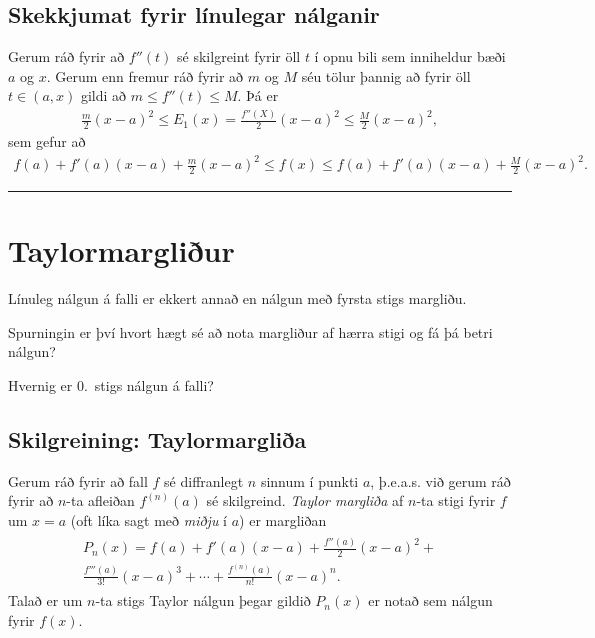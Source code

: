 \documentclass[a4paper,10pt,icelandic]{sphinxmanual}
\begin{document}
\subsection{Skekkjumat fyrir línulegar nálganir}
\label{kafli03:skekkjumat-fyrir-linulegar-nalganir}
Gerum ráð fyrir að \(f''(t)\) sé skilgreint fyrir öll \(t\) í
opnu bili sem inniheldur bæði \(a\) og \(x\). Gerum enn fremur
ráð fyrir að \(m\) og \(M\) séu tölur þannig að fyrir öll
\(t\in (a, x)\) gildi að \(m\leq f''(t)\leq M\). Þá er
\begin{equation*}
\begin{split}\frac{m}{2}(x-a)^2\leq E_1(x)
=\frac{f''(X)}{2}(x-a)^2\leq \frac{M}{2}(x-a)^2,\end{split}
\end{equation*}
sem gefur að
\begin{equation*}
\begin{split}f(a)+f'(a)(x-a)+\frac{m}{2}(x-a)^2\leq f(x)
\leq f(a)+f'(a)(x-a)+\frac{M}{2}(x-a)^2.\end{split}
\end{equation*}

\bigskip\hrule{}\bigskip



\section{Taylormargliður}
\label{kafli03:taylormargliur}
Línuleg nálgun á falli er ekkert annað en nálgun með fyrsta stigs
margliðu.

Spurningin er því hvort hægt sé að nota margliður af hærra stigi og fá
þá betri nálgun?

Hvernig er 0. stigs nálgun á falli?


\subsection{Skilgreining: Taylormargliða}
\label{kafli03:index-13}\label{kafli03:skilgreining-taylormarglia}
Gerum ráð fyrir að fall \(f\) sé diffranlegt \(n\) sinnum í
punkti \(a\), þ.e.a.s. við gerum ráð fyrir að \(n\)-ta afleiðan
\(f^{(n)}(a)\) sé skilgreind. \emph{Taylor margliða} af \(n\)-ta
stigi fyrir \(f\) um \(x=a\) (oft líka sagt með \emph{miðju} í
\(a\)) er margliðan
\begin{equation*}
\begin{split}\begin{gathered}
    P_n(x)=f(a)+f'(a)(x-a)+\frac{f''(a)}{2}(x-a)^2+ \\
    \frac{f'''(a)}{3!}(x-a)^3+\cdots+\frac{f^{(n)}(a)}{n!}(x-a)^n.\end{gathered}\end{split}
\end{equation*}
Talað er um \(n\)-ta stigs Taylor nálgun þegar gildið \(P_n(x)\)
er notað sem nálgun fyrir \(f(x)\).
\end{document}
